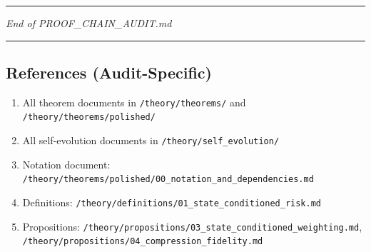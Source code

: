 \documentclass[
  12pt,
]{ctexart}
\providecommand{\tightlist}{%
  \setlength{\itemsep}{0pt}\setlength{\parskip}{0pt}}
\begin{document}
\begin{center}\rule{0.5\linewidth}{0.5pt}\end{center}

\emph{End of PROOF\_CHAIN\_AUDIT.md}

\begin{center}\rule{0.5\linewidth}{0.5pt}\end{center}

\subsection{References
(Audit-Specific)}\label{references-audit-specific}

\begin{enumerate}
\def\labelenumi{\arabic{enumi}.}
\tightlist
\item
  All theorem documents in \texttt{/theory/theorems/} and
  \texttt{/theory/theorems/polished/}
\item
  All self-evolution documents in \texttt{/theory/self\_evolution/}
\item
  Notation document:
  \texttt{/theory/theorems/polished/00\_notation\_and\_dependencies.md}
\item
  Definitions:
  \texttt{/theory/definitions/01\_state\_conditioned\_risk.md}
\item
  Propositions:
  \texttt{/theory/propositions/03\_state\_conditioned\_weighting.md},
  \texttt{/theory/propositions/04\_compression\_fidelity.md}
\end{enumerate}
\end{document}
